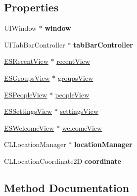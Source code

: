 \subsection*{Properties}
\begin{DoxyCompactItemize}
\item 
\hypertarget{interface_app_delegate_acf48ac24125e688cac1a85445cd7fac2}{}U\+I\+Window $\ast$ {\bfseries window}\label{interface_app_delegate_acf48ac24125e688cac1a85445cd7fac2}

\item 
\hypertarget{interface_app_delegate_a97f54a4a7a7ea9200720661abab5dffe}{}U\+I\+Tab\+Bar\+Controller $\ast$ {\bfseries tab\+Bar\+Controller}\label{interface_app_delegate_a97f54a4a7a7ea9200720661abab5dffe}

\item 
\hyperlink{interface_e_s_recent_view}{E\+S\+Recent\+View} $\ast$ \hyperlink{interface_app_delegate_aaaf03fe5c78e688b18a146586a47d1a8}{recent\+View}
\item 
\hyperlink{interface_e_s_groups_view}{E\+S\+Groups\+View} $\ast$ \hyperlink{interface_app_delegate_a994853aabe4e94efd6973f3938ffc2f8}{groups\+View}
\item 
\hyperlink{interface_e_s_people_view}{E\+S\+People\+View} $\ast$ \hyperlink{interface_app_delegate_a10be2ec9d2d8250b3d3474817074e9a1}{people\+View}
\item 
\hyperlink{interface_e_s_settings_view}{E\+S\+Settings\+View} $\ast$ \hyperlink{interface_app_delegate_ab9acacc615638a327d7cecfaa665e2c2}{settings\+View}
\item 
\hyperlink{interface_e_s_welcome_view}{E\+S\+Welcome\+View} $\ast$ \hyperlink{interface_app_delegate_a9bff5a3a8207cbf80c8d9a325a6314f3}{welcome\+View}
\item 
\hypertarget{interface_app_delegate_a761a4fca92616724f55df0d8829df7c9}{}C\+L\+Location\+Manager $\ast$ {\bfseries location\+Manager}\label{interface_app_delegate_a761a4fca92616724f55df0d8829df7c9}

\item 
\hypertarget{interface_app_delegate_a9fd0ff1892f8d79580c105c42cb1edfb}{}C\+L\+Location\+Coordinate2\+D {\bfseries coordinate}\label{interface_app_delegate_a9fd0ff1892f8d79580c105c42cb1edfb}

\end{DoxyCompactItemize}


\subsection{Method Documentation}
\hypertarget{interface_app_delegate_ae8f49b11e08aa179db59ab3dde6d81a5}{}
